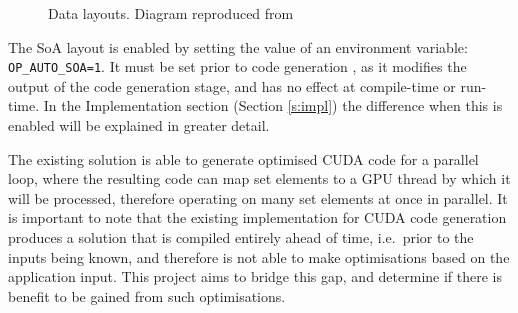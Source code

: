 \begin{figure}[h]
  \centering

  \quad

  \caption{\label{fig:SoA_v_AoS} Data layouts. Diagram reproduced from \cite{gpudesign}}
\end{figure}

The SoA layout is enabled by setting the value of an environment variable:\\ \verb|OP_AUTO_SOA=1|. It must be set prior to code generation \cite[p13]{manual}, as it modifies the output of the code generation stage, and has no effect at compile-time or run-time. In the Implementation section (Section \ref{s:impl}) the difference when this is enabled will be explained in greater detail.
\par
The existing solution is able to generate optimised CUDA code for a parallel loop, where the resulting code can map set elements to a GPU thread by which it will be processed, therefore operating on many set elements at once in parallel. It is important to note that the existing implementation for CUDA code generation produces a solution that is compiled entirely ahead of time, i.e.\ prior to the inputs being known, and therefore is not able to make optimisations based on the application input. This project aims to bridge this gap, and determine if there is benefit to be gained from such optimisations.

